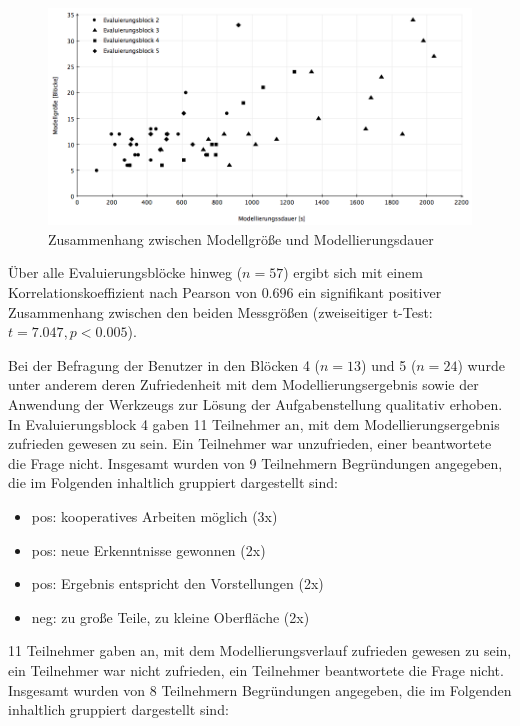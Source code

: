 \begin{figure}[htbp]
	\centering
		\includegraphics[width=15cm]{img/Evaluierung/correlation.png}
	\caption{Zusammenhang zwischen Modellgröße und Modellierungsdauer}
	\label{fig:img_Evaluierung_correlation}
\end{figure}

Über alle Evaluierungsblöcke hinweg ($n=57$) ergibt sich mit einem Korrelationskoeffizient nach Pearson von $0.696$ ein signifikant positiver Zusammenhang zwischen den beiden Messgrößen (zweiseitiger t-Test: $t=7.047, p<0.005$).

Bei der Befragung der Benutzer in den Blöcken 4 ($n=13$) und 5 ($n=24$) wurde unter anderem deren Zufriedenheit mit dem Modellierungsergebnis sowie der Anwendung der Werkzeugs zur Lösung der Aufgabenstellung qualitativ erhoben. In Evaluierungsblock 4 gaben 11 Teilnehmer an, mit dem Modellierungsergebnis zufrieden gewesen zu sein. Ein Teilnehmer war unzufrieden, einer beantwortete die Frage nicht. Insgesamt wurden von 9 Teilnehmern Begründungen angegeben, die im Folgenden inhaltlich gruppiert dargestellt sind:

\begin{itemize}
	\item pos: kooperatives Arbeiten möglich (3x)
	\item pos: neue Erkenntnisse gewonnen (2x)
	\item pos: Ergebnis entspricht den Vorstellungen (2x)
	\item neg: zu große Teile, zu kleine Oberfläche (2x)
\end{itemize}

11 Teilnehmer gaben an, mit dem Modellierungsverlauf zufrieden gewesen zu sein, ein Teilnehmer war nicht zufrieden, ein Teilnehmer beantwortete die Frage nicht. Insgesamt wurden von 8 Teilnehmern Begründungen angegeben, die im Folgenden inhaltlich gruppiert dargestellt sind:

